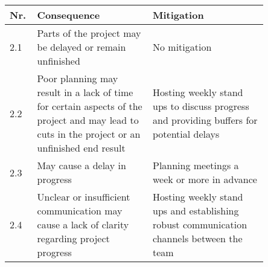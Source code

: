 \documentclass{article} %
\begin{document}
\begin{center}
    \begin{tabular}{| p{0.05\linewidth} | p{0.4\linewidth} | p{0.4\linewidth} |}
        \hline
        Nr. & Consequence                                                                                                                                   & Mitigation                                                                               \\ [0.5ex]
        \hline\hline
        2.1 & Parts of the project may be delayed or remain unfinished                                                                                      & No mitigation                                                                            \\
        \hline
        2.2 & Poor planning may result in a lack of time for certain aspects of the project and may lead to cuts in the project or an unfinished end result & Hosting weekly stand ups to discuss progress and providing buffers for potential delays  \\
        \hline
        2.3 & May cause a delay in progress                                                                                                                 & Planning meetings a week or more in advance                                              \\
        \hline
        2.4 & Unclear or insufficient communication may cause a lack of clarity regarding project progress                                                  & Hosting weekly stand ups and establishing robust communication channels between the team \\
        \hline
    \end{tabular}
\end{center}

\newpage
\end{document}
